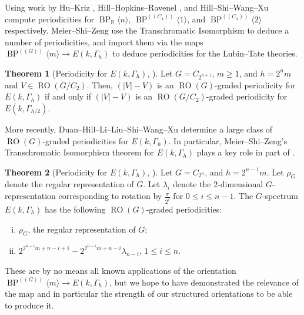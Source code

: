\documentclass[a4paper, 10pt]{article}
\newcommand{\BPGm}{{\BP^{(\!(G)\!)}}\langle m\rangle}
\newcommand{\BP}{\operatorname{BP}}
\newcommand{\BPRn}{{\BP_{\mathbb{R}}\langle n\rangle}}
\newcommand{\RO}{\operatorname{RO}}
\theoremstyle{definition}
\newtheorem{theorem}[theorem]{Theorem}
\begin{document}
Using work by Hu--Kriz \cite{HuKrizReal}, Hill--Hopkins--Ravenel \cite{HillHopkinsRavenel2017C4RealKTheory}, and Hill--Shi--Wang--Xu \cite{hill2023slice} compute periodicities for \(\BPRn\), \(\BP^{(\!(C_4)\!)}\langle 1\rangle\), and \(\BP^{(\!(C_4)\!)}\langle 2\rangle\) respectively. Meier--Shi--Zeng use the Transchromatic Isomorphism to deduce a number of periodicities, and import them via the maps \(\BPGm\to E(k,\Gamma_h)\) to deduce periodicities for the Lubin--Tate theories.

\begin{theorem}[Periodicity for \(E(k,\Gamma_h)\), {\cite[Theorem B]{meier2024transchromaticphenomenaequivariantslice}}]
    Let \(G=C_{2^{n+1}}\), \(m\geq 1\), and \(h=2^nm\) and \(V\in \RO(G/C_2)\).
    Then, \((\vert V\vert -V)\) is an \(\RO(G)\)-graded periodicity for \(E(k,\Gamma_h)\) if and only if \((\vert V\vert -V)\) is an \(\RO(G/C_2)\)-graded periodicity for \(E(k,\Gamma_{h/2})\).
\end{theorem}

More recently, Duan--Hill--Li--Liu--Shi--Wang--Xu determine a large class of \(\RO(G)\)-graded periodicities for \(E(k,\Gamma_h)\).
In particular, Meier--Shi--Zeng's Transchromatic Isomorphism theorem for \(E(k,\Gamma_h)\) plays a key role in part of {\cite[Part (1) of Theorem B]{duan2025periodicityfinitecomplexityhigher}}.

\begin{theorem}[Periodicity for \(E(k,\Gamma_h)\), {\cite[Part (1) of Theorem B]{duan2025periodicityfinitecomplexityhigher}}]
    Let \(G=C_{2^n}\), and \(h=2^{n-1}m\). 
    Let \(\rho_G\) denote the regular representation of \(G\). 
    Let \(\lambda_i\) denote the \(2\)-dimensional $G$-representation corresponding to rotation by \(\frac{\pi}{2^i}\) for \(0 \leq i \leq n-1\).
    The \(G\)-spectrum \(E(k,\Gamma_h)\) has the following \(\RO(G)\)-graded periodicities:
    \begin{enumerate}[(i)]
        \item \(\rho_{G}\), the regular representation of \(G\);
        \item \(2^{2^{n-i}m+n-i+1}-2^{2^{n-i}m+n-i}\lambda_{n-i}\), \(1\leq i\leq n\).
    \end{enumerate}
\end{theorem}

These are by no means all known applications of the orientation $\BPGm \to E(k,\Gamma_h)$, but we hope to have demonstrated the relevance of the map and in particular the strength of our structured orientations to be able to produce it.
\end{document}
